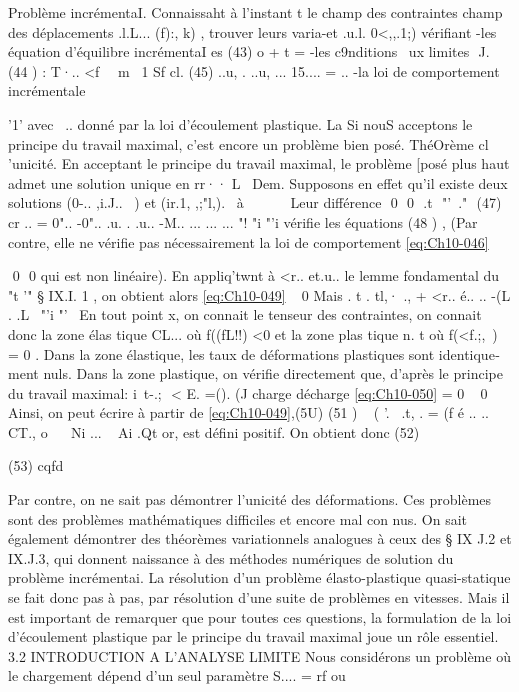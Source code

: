 {{Problème incrémentaI. Connaissaht à l'instant t le champ des contraintes champ des déplacements .l.L... (f):, k) , trouver leurs varia-et .u.l. 0<,,.1;) vérifiant -les équation d'équilibre incrémentaI es 
(43) o
+ t = 
-les c9nditions ~ux limites 
 J. 
(44 ) : 
T·..
<f~~ m~ 1 Sf 
cl.
(45) ..u, . 
..u, ... 15.... = .. 
-la loi de comportement incrémentale 

'1'
avec ~.. donné par la loi d'écoulement plastique.
La 
Si nouS acceptons le principe du travail maximal, c'est encore 
un problème bien posé. 
ThéOrème cl 'unicité. En acceptant le principe du travail maximal, le problème [posé plus haut admet une solution unique en rr·· 
L~ 
Dem. Supposons en effet qu'il existe deux solutions (0-.. ,i.J..~ ) et (ir.1, ,;"l,).
~à ~ ~~ ~ 
Leur différence 
 0  0  .t  "'\
." 
(47) cr .. = 0".. -0".. .u. . .u.. -M.. 
... ... ...
"! "i "'i 
vérifie les équations 
(48 ) , 
(Par contre, elle ne vérifie pas nécessairement la loi de comportement \eqref{eq:Ch10-046} 

 0  0 
qui est non linéaire). En appliq'twnt à <r.. et.u.. le lemme fondamental du "t '" 
§ IX.I. 1 , on obtient alors 
\eqref{eq:Ch10-049} ~ 0 Mais 
. t . tl,· .,
+ <r.. é.. .. -(L . 
.L~ "'i "'~ 
En tout point x, on connait le tenseur des contraintes, on connait donc la 
zone élas tique CL... où f((fL!!) <0 et la zone plas tique n. t où f(<f.;,~) = 0 . 
Dans la zone élastique, les taux de déformations plastiques sont identique­
ment nuls. Dans la zone plastique, on vérifie directement que, d'après le 
principe du travail maximal: 
i\
t-.;  < E. =(). 
(J 
charge décharge 
\eqref{eq:Ch10-050} = 0 ~ 0 
Ainsi, on peut écrire à partir de \eqref{eq:Ch10-049},(5U) 
(51 ) 
~
( 
'.~ .t, . 
= (f é .. .. CT., o
~~ Ni ... ~ Ai
.Qt 
or, est défini positif. On obtient donc 
(52) 

(53) 
cqfd 


Par contre, on ne sait pas démontrer l'unicité des déformations. 
Ces problèmes sont des problèmes mathématiques difficiles et encore mal con­
nus. 
On sait également démontrer des théorèmes variationnels analogues à ceux des § IX J.2 et IX.J.3, qui donnent naissance à des méthodes numéri­ques de solution du problème incrémentai. La résolution d'un problème élas­to-plastique quasi-statique se fait donc pas à pas, par résolution d'une suite de problèmes en vitesses. Mais il est important de remarquer que pour toutes ces questions, la formulation de la loi d'écoulement plastique par le principe du travail maximal joue un rôle essentiel. 
3.2 INTRODUCTION A L'ANALYSE LIMITE 
Nous considérons un problème où le chargement dépend d'un seul paramètre 
S.... = rf ou 

}}
